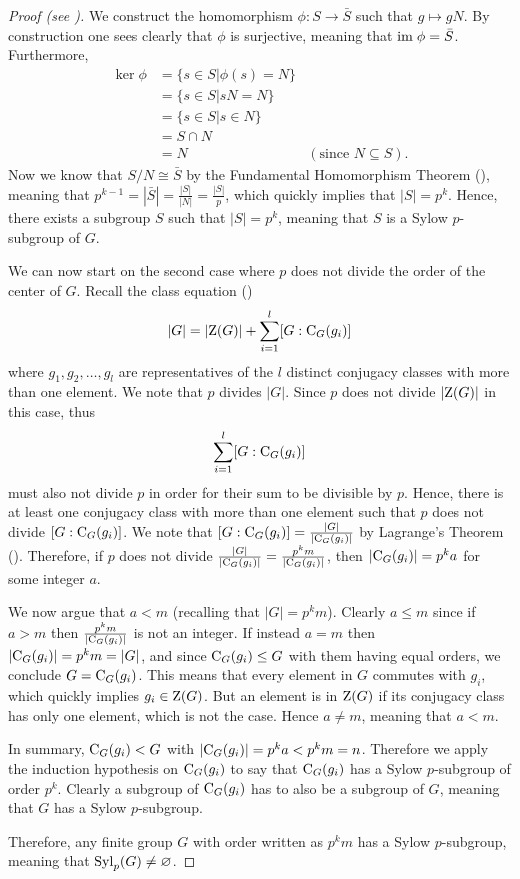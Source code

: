 \begin{proof}[Proof (see {\cite[pp.~1--3]{mann_2011}})]
    We construct the homomorphism $\phi: S \to \bar{S}$ such that $g \mapsto gN$. By construction one sees clearly that $\phi$ is surjective, meaning that $\mathrm{im}\; \phi = \bar{S}$. Furthermore,
    \begin{align*}
        \ker\phi &= \{s \in S \vert \phi(s) = N\}\\
        &= \{s \in S \vert sN = N \}\\
        &= \{s \in S \vert s \in N \}\\
        &= S \cap N\\
        &= N & (\text{since } N \subseteq S).
    \end{align*}
    Now we know that $S/N \cong \bar{S}$ by the Fundamental Homomorphism Theorem (), meaning that $p^{k-1} = |\bar{S}| = \frac{|S|}{|N|} = \frac{|S|}{p}$, which quickly implies that $|S| = p^k$. Hence, there exists a subgroup $S$ such that $|S| = p^k$, meaning that $S$ is a Sylow $p$-subgroup of $G$.

    We can now start on the second case where $p$ does not divide the order of the center of $G$. Recall the class equation ()
    \[
        |G| = |\mathrm{Z}(G)| + \sum_{i=1}^l [G:\mathrm{C}_{G}(g_i)]
    \]
    where $g_1, g_2, \dots, g_l$ are representatives of the $l$ distinct conjugacy classes with more than one element. We note that $p$ divides $|G|$. Since $p$ does not divide $|\mathrm{Z}(G)|$ in this case, thus
    \[
        \sum_{i=1}^l [G:\mathrm{C}_{G}(g_i)]
    \]
    must also not divide $p$ in order for their sum to be divisible by $p$. Hence, there is at least one conjugacy class with more than one element such that $p$ does not divide $[G:\mathrm{C}_{G}(g_i)]$. We note that $[G:\mathrm{C}_{G}(g_i)] = \frac{|G|}{|\mathrm{C}_{G}(g_i)|}$ by Lagrange's Theorem (). Therefore, if $p$ does not divide $\frac{|G|}{|\mathrm{C}_{G}(g_i)|} = \frac{p^k m}{|\mathrm{C}_{G}(g_i)|}$, then $|\mathrm{C}_{G}(g_i)| = p^ka$ for some integer $a$.

    We now argue that $a < m$ (recalling that $|G| = p^km$). Clearly $a \leq m$ since if $a > m$ then $\frac{p^k m}{|\mathrm{C}_{G}(g_i)|}$ is not an integer. If instead $a = m$ then $|\mathrm{C}_{G}(g_i)| = p^km = |G|$, and since $\mathrm{C}_{G}(g_i) \leq G$ with them having equal orders, we conclude $G = \mathrm{C}_{G}(g_i)$. This means that every element in $G$ commutes with $g_i$, which quickly implies $g_i \in \mathrm{Z}(G)$. But an element is in $\mathrm{Z}(G)$ if its conjugacy class has only one element, which is not the case. Hence $a \neq m$, meaning that $a < m$.

    In summary, $\mathrm{C}_{G}(g_i) < G$ with $|\mathrm{C}_{G}(g_i)| = p^ka < p^km = n$. Therefore we apply the induction hypothesis on $\mathrm{C}_{G}(g_i)$ to say that $\mathrm{C}_{G}(g_i)$ has a Sylow $p$-subgroup of order $p^k$. Clearly a subgroup of $\mathrm{C}_{G}(g_i)$ has to also be a subgroup of $G$, meaning that $G$ has a Sylow $p$-subgroup.

    Therefore, any finite group $G$ with order written as $p^k m$ has a Sylow $p$-subgroup, meaning that $\mathrm{Syl}_{p}(G) \neq \varnothing$.
\end{proof}


